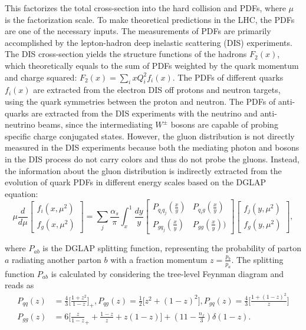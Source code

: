 \noindent This factorizes the total cross-section into the hard collision and PDFs, where $\mu$ is the factorization scale. To make theoretical predictions in the LHC, the PDFs are one of the necessary inputs. The measurements of PDFs are primarily accomplished by the lepton-hadron deep inelastic scattering (DIS) experiments. The DIS cross-section yields the structure functions of the hadrons $F_2(x)$, which theoretically equals to the sum of PDFs weighted by the quark momentum and charge squared: $F_2(x) = \sum_i x Q^2_i f_i(x)$. The PDFs of different quarks $f_i(x)$ are extracted from the electron DIS off protons and neutron targets, using the quark symmetries between the proton and neutron. The PDFs of anti-quarks are extracted from the DIS experiments with the neutrino and anti-neutrino beams, since the intermediating $W^\pm$ bosons are capable of probing specific charge conjugated states. However, the gluon distribution is not directly measured in the DIS experiments because both the mediating photon and \PW bosons in the DIS process do not carry colors and thus do not probe the gluons. Instead, the information about the gluon distribution is indirectly extracted from the evolution of quark PDFs in different energy scales based on the DGLAP equation:
\begin{equation}
    \mu \frac{d}{d\mu} \begin{bmatrix} f_i(x,\mu^2) \\ f_g(x,\mu^2) \end{bmatrix} = 
    \sum_j \frac{\alpha_s}{\pi} \int_x^1 
    \frac{dy}{y}
    \begin{bmatrix} P_{q_i q_j}(\frac{x}{y}) & P_{q_i g}(\frac{x}{y}) \\ P_{g q_j}(\frac{x}{y}) & P_{gg}(\frac{x}{y})) \end{bmatrix} \begin{bmatrix} f_j(y,\mu^2) \\ f_g(y, \mu^2) \end{bmatrix} ,
    \label{eqn:physics:qft:ppCollision:dglap}
\end{equation}

\noindent where $P_{ab}$ is the DGLAP splitting function, representing the probability of parton $a$ radiating another parton $b$ with a fraction momentum $z=\frac{p_b}{p_a}$. The splitting  function $P_{ab}$ is calculated by considering the tree-level Feynman diagram and reads as
\begin{equation}
\begin{split}
	P_{qq}(z) &= \frac{4}{3}\bigg[\frac{1+z^2}{1-z} \bigg]_+, P_{qg}(z)=\frac{1}{2} \bigg[z^2+(1-z)^2 \bigg], P_{gq}(z)=\frac{4}{3}\bigg[\frac{1+(1-z)^2}{z} \bigg]\\
    P_{gg}(z) &= 6 \bigg[ \frac{z}{1-z}_+ + \frac{1-z}{z} + z(1-z) \bigg] +(11-\frac{n_f}{3})\delta(1-z) .
\end{split}
\label{eqn:physics:qft:ppCollision:splitting}
\end{equation}

